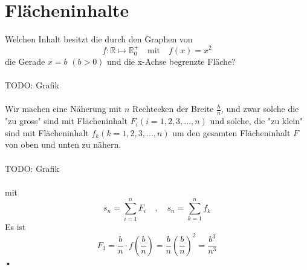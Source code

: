 \documentclass{report}
\begin{document}
\section{Flächeninhalte}
Welchen Inhalt besitzt die durch den Graphen von
\begin{equation}f: \mathbb{R} \mapsto \mathbb{R}_0^+ \quad \mbox{mit} \quad f(x) = x^2\end{equation}
die Gerade $x=b$ $(b > 0)$ und die x-Achse begrenzte Fläche?
\\\\TODO: Grafik\\\\
Wir machen eine Näherung mit $n$ Rechtecken der Breite $\frac{b}{n}$, und zwar solche die "zu gross" sind mit Flächeninhalt $F_i (i=1,2,3,...,n)$ und solche, die "zu klein" sind mit Flächeninhalt $f_k (k=1,2,3,...,n)$ um den gesamten Flächeninhalt $F$ von oben und unten zu nähern.
\\\\TODO: Grafik\\\\
mit
\begin{equation}s_n = \sum_{i=1}^n F_i \quad , \quad s_n = \sum_{k=1}^n f_k\end{equation}
Es ist
\begin{equation}F_1 = \frac{b}{n} \cdot f(\frac{b}{n}) = \frac{b}{n} (\frac{b}{n})^2 = \frac{b^3}{n^3}\end{equation}•
\end{document}
